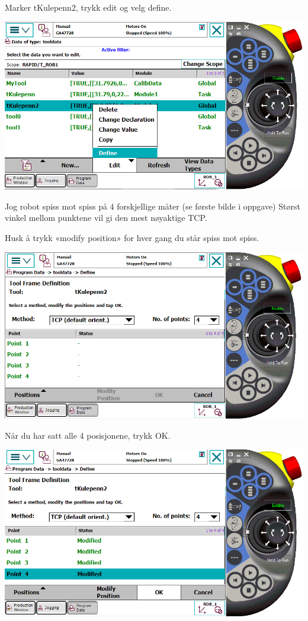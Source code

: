 Marker tKulepenn2, trykk edit og velg define.

\vspace{1cm}

\includegraphics[width=1\textwidth]{i04861x11}

\vspace{1cm}

Jog robot spiss mot spiss på 4 forskjellige måter (se første bilde
i oppgave) Størst vinkel mellom punktene vil gi den mest nøyaktige
TCP.

Husk å trykk «modify position» for hver gang du står spiss mot spiss.

\vspace{1cm}

\includegraphics[width=1\textwidth]{i04861x12}

\vspace{1cm}

Når du har satt alle 4 posisjonene, trykk OK.

\vspace{1cm}

\includegraphics[width=1\textwidth]{i04861x13}

